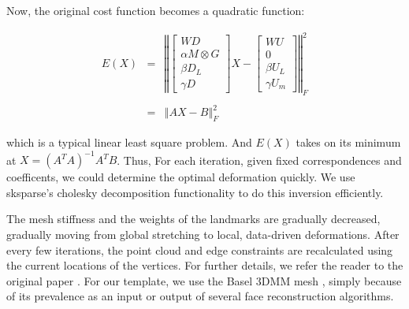 Now, the original cost function becomes a quadratic function:

\begin{equation}
  \begin{array}{lcl} 
    E(X) & = & {\left\Vert \left[ \begin{array}{c} WD \\ \alpha M \otimes G \\ \beta D_L \\ \gamma D \end{array} \right] X - \left[ \begin{array}{c} WU \\  0 \\  \beta U_L \\ \gamma U_m \end{array} \right] \right\Vert_F^2} \\
     
    & & \\
    
  & = & \left\Vert AX - B \right\Vert_F^2
  \end{array} 
\end{equation}

which is a typical linear least square problem. And $E(X)$ takes on its
minimum at $X = (A^TA)^{-1}A^TB$.  Thus, For each iteration, given
fixed correspondences and coefficents, we could determine the optimal
deformation quickly. We use sksparse's cholesky decomposition functionality to do this inversion efficiently.

 
 
 The mesh stiffness and the weights of the landmarks are gradually decreased, gradually moving from global stretching to local, data-driven deformations. After every few iterations, the point cloud and edge constraints are recalculated using the current locations of the vertices. For further details, we refer the reader to the original paper \cite{amberg2007optimal}. For our template, we use the Basel 3DMM mesh \cite{blanz1999morphable}, simply because of its prevalence as an input or output of several face reconstruction algorithms.
